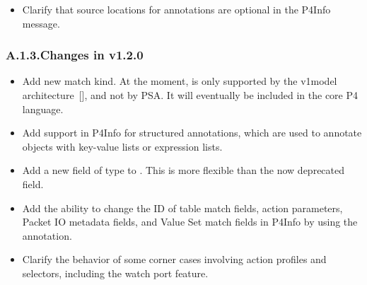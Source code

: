 \documentclass[11pt]{article}
\begin{document}
{\begin{itemize}[noitemsep,topsep=\mdcompacttopsep]
\item{}Clarify that source locations for annotations are optional in the P4Info
message.%
\end{itemize}%

\subsubsection{A.1.3.\hspace*{0.5em}Changes in v1.2.0}\label{sec-changes-in-v120}%

\begin{itemize}[noitemsep,topsep=\mdcompacttopsep]%

\item{}Add new  match kind. At the moment,  is only supported by
the v1model architecture~[], and not by PSA. It will eventually be
included in the core P4 language.%

\item{}Add support in P4Info for structured annotations, which are used to annotate
objects with key-value lists or expression lists.%

\item{}Add a new  field of type  to . This is more
flexible than the now deprecated  field.%

\item{}Add the ability to change the ID of table match fields, action parameters,
Packet IO metadata fields, and Value Set match fields in P4Info by using the
 annotation.%

\item{}Clarify the behavior of some corner cases involving action profiles and
selectors, including the watch port feature.%


\end{itemize}}
\end{document}
